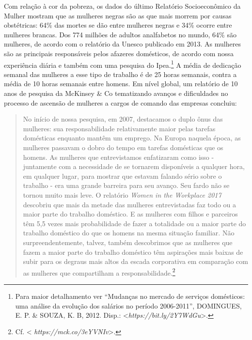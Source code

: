 Com relação à cor da pobreza, os dados do último Relatório
Socioeconômico da Mulher mostram que as mulheres negras são as que mais
morrem por causas obstétricas: 64\% das mortes se dão entre mulheres
negras e 34\% ocorre entre mulheres brancas. Dos 774 milhões de adultos
analfabetos no mundo, 64\% são mulheres, de acordo com o relatório da
Unesco publicado em 2013. As mulheres são as principais responsáveis
pelos afazeres domésticos, de acordo com nossa experiência diária e
também com uma pesquisa do Ipea.\footnote{Para maior detalhamento ver
  ``Mudanças no mercado de serviços domésticos: uma análise da evolução
  dos salários no período 2006-2011'', DOMINGUES, E. P. \& SOUZA, K. B,
  2012. Disp.: \textless{}\emph{https://bit.ly/2Y7WdGu}\textgreater{}.} A
média de dedicação semanal das mulheres a esse tipo de trabalho é de 25
horas semanais, contra a média de 10 horas semanais entre homens. Em
nível global, um relatório de 10 anos de pesquisa da McKinsey \& Co
tematizando avanços e dificuldades no processo de ascensão de mulheres a
cargos de comando das empresas concluiu:

\begin{quote}
No início de nossa pesquisa, em 2007, destacamos o duplo ônus das
mulheres: sua responsabilidade relativamente maior pelas tarefas
domésticas enquanto mantêm um emprego. Na Europa naquela época, as
mulheres passavam o dobro do tempo em tarefas domésticas que os homens.
As mulheres que entrevistamos enfatizaram como isso - juntamente com a
necessidade de se tornarem disponíveis a qualquer hora, em qualquer
lugar, para mostrar que estavam falando sério sobre o trabalho - era uma
grande barreira para seu avanço. Seu fardo não se tornou muito mais
leve. O relatório \emph{Women in the Workplace 2017} descobriu que mais
da metade das mulheres entrevistadas faz todo ou a maior parte do
trabalho doméstico. E as mulheres com filhos e parceiros têm 5,5 vezes
mais probabilidade de fazer a totalidade ou a maior parte do trabalho
doméstico do que os homens na mesma situação familiar. Não
surpreendentemente, talvez, também descobrimos que as mulheres que fazem
a maior parte do trabalho doméstico têm aspirações mais baixas de subir
para os degraus mais altos da escada corporativa em comparação com as
mulheres que compartilham a responsabilidade.\footnote{Cf. \textless{}
  \emph{https://mck.co/3eYVNIv}\textgreater{}.}
\end{quote}

